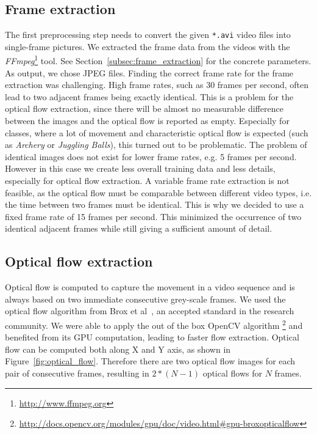 \subsection{Frame extraction}
The first preprocessing step needs to convert the given \texttt{*.avi} video files into single-frame pictures.
We extracted the frame data from the videos with the \emph{FFmpeg}\footnote{\url{http://www.ffmpeg.org}} tool.
See Section~\ref{subsec:frame_extraction} for the concrete parameters.
As output, we chose JPEG files.
Finding the correct frame rate for the frame extraction was challenging.
High frame rates, such as 30 frames per second, often lead to two adjacent frames being exactly identical.
This is a problem for the optical flow extraction, since there will be almost no measurable difference between the images and the optical flow is reported as empty.
Especially for classes, where a lot of movement and characteristic optical flow is expected (such as \emph{Archery} or \emph{Juggling Balls}), this turned out to be problematic.
The problem of identical images does not exist for lower frame rates, e.g. 5 frames per second.
However in this case we create less overall training data and less details, especially for optical flow extraction.
A variable frame rate extraction is not feasible, as the optical flow must be comparable between different video types, i.e. the time between two frames must be identical.
This is why we decided to use a fixed frame rate of 15 frames per second.
This minimized the occurrence of two identical adjacent frames while still giving a sufficient amount of detail.

\subsection{Optical flow extraction}
Optical flow is computed to capture the movement in a video sequence and is always based on two immediate consecutive grey-scale frames.
We used the optical flow algorithm from Brox et al~\cite{brox2004high}, an accepted standard in the research community.
We were able to apply the out of the box OpenCV algorithm \footnote{\url{http://docs.opencv.org/modules/gpu/doc/video.html\#gpu-broxopticalflow}} and benefited from its GPU computation, leading to faster flow extraction.
Optical flow can be computed both along X and Y axis, as shown in Figure~\ref{fig:optical_flow}.
Therefore there are two optical flow images for each pair of consecutive frames, resulting in $2 * (N - 1)$ optical flows for $N$ frames.

